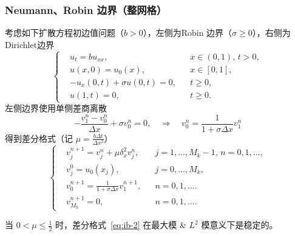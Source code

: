 \subsubsection{Neumann、Robin 边界（整网格）}

考虑如下扩散方程初边值问题（$b > 0$），左侧为Robin 边界（$\sigma \ge 0$），右侧为Dirichlet边界
\[
    \left\{
    \begin{aligned}
         & u_t = b u_{xx},                 &  & x \in (0,1),\, t > 0, \\
         & u(x,0) = u_0(x),                &  & x \in [0,1],          \\
         & - u_x(0,t) + \sigma u(0,t) = 0, &  & t \ge 0,              \\
         & u(1,t) = 0,                     &  & t \ge 0.
    \end{aligned}
    \right.
\]
左侧边界使用单侧差商离散
\[
    -  \frac{v_1^n - v_0^n}{\Delta x} + \sigma v_0^n = 0, \quad \Rightarrow \quad v_0^n = \frac{1}{1 + \sigma \Delta x} v_1^n
\]
得到差分格式（记 $\mu = \frac{b \Delta t}{\Delta x^2}$）
\begin{equation}
    \left\{
    \begin{aligned}
         & v_j^{n+1} = v_j^n + \mu \delta_x^2 v_j^n,            &  & j=1,\dots,M_k-1,\, n=0,1,\dots, \\
         & v_j^0 = u_0(x_j),                                    &  & j=0,\dots,M_k,                  \\
         & v_0^{n+1} = \frac{1}{1 + \sigma \Delta x} v_1^{n+1}, &  & n=0,1,\dots.                    \\
         & v_{M_k}^{n+1} = 0,                                   &  & n=0,1,\dots.
    \end{aligned}
    \right.    \label{eq:ib-2}
\end{equation}

\begin{example}
    当 $0 < \mu \le \frac12$ 时，差分格式~\eqref{eq:ib-2} 在最大模 \& $L^2$ 模意义下是稳定的。
\end{example}

